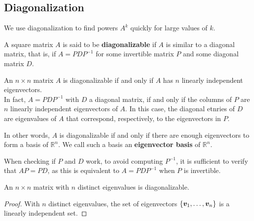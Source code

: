 \documentclass[11pt]{scrartcl}
\theoremstyle{dotlessP}
\theoremstyle{dotlessN}
\DeclarePairedDelimiter\set{\{}{\}}
\newcommand{\reals}{\mathbb{R}} %
\begin{document}
\subsection{Diagonalization}
\begin{remark}
	We use diagonalization to find powers $A^k$ quickly for large values of $k$.
\end{remark}
\begin{definition}
	A square matrix $A$ is said to be \textbf{diagonalizable} if $A$ is similar to a diagonal matrix, that is, if $A = PDP^{-1}$ for some invertible matrix $P$ and some diagonal matrix $D$.
\end{definition}
\begin{theorem}
	An $n \times n$ matrix $A$ is diagonalizable if and only if $A$ has $n$ linearly independent eigenvectors.
	\\

	In fact,  $A = PDP^{-1}$ with $D$ a diagonal matrix, if and only if the columns of $P$ are $n$ linearly independent eigenvectors of $A$. In this case, the diagonal etnries of $D$ are eigenvalues of $A$ that correspond, respectively, to the eigenvectors in $P$.
\end{theorem}
\begin{remark}
	In other words, $A$ is diagonalizable if and only if there are enough eigenvectors to form a basis of $\reals^n$. We call such a basis an \textbf{eigenvector basis} of $\reals^n$.
\end{remark}
\begin{remark}
	When checking if $P$ and $D$ work, to avoid computing $P^{-1}$, it is sufficient to verify that $AP = PD$, as this is equivalent to $A = PDP^{-1}$ when $P$ is invertible.
\end{remark}
\begin{theorem}
	An $n \times n$ matrix with  $n$ distinct eigenvalues is diagonalizable.
\end{theorem}
\begin{proof}
	With $n$ distinct eigenvalues, the set of eigenvectors $\set*{\bm{v}_1, \dots, \bm{v}_n}$ is a linearly independent set.
\end{proof}
\end{document}
